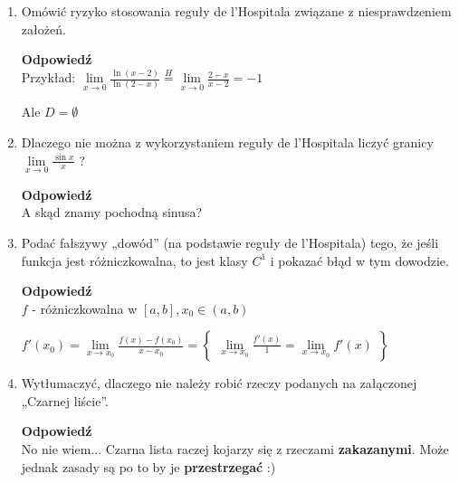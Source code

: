 \documentclass[12pt,a4paper]{article}
\theoremstyle{break}
\newcommand{\Odp}[1]{
		\begin{mdframed}[style=zadanie]
			\textbf{Odpowiedź}\\
			#1
		\end{mdframed}
	}
\begin{document}
\begin{enumerate}[1.]
	\item Omówić ryzyko stosowania reguły de l’Hospitala związane z niesprawdzeniem założeń.
	\Odp{
		Przykład: $\lim\limits_{x\rightarrow 0} \frac{\ln (x-2)}{\ln (2-x)}\overset{H}{=}\lim\limits_{x\rightarrow 0}\frac{2-x}{x-2}=-1$
		
		Ale $D=\emptyset$
	}
	
	\item Dlaczego nie można z wykorzystaniem reguły de l’Hospitala liczyć granicy $\lim\limits_{x\rightarrow0}\frac{\sin x}{x}$ ?
	\Odp{
		A skąd znamy pochodną sinusa?
	}
	
	\item Podać fałszywy „dowód” (na podstawie reguły de l’Hospitala) tego, że jeśli funkcja jest różniczkowalna, to jest klasy $C^1$ i pokazać błąd w tym dowodzie.
	\Odp{
		$f$ - różniczkowalna w $[a,b], x_0\in(a,b)$
		
		$f'(x_0)=\lim\limits_{x\rightarrow x_0}\frac{f(x)-f(x_0)}{x-x_0}=\begin{Bmatrix}
			\lim\limits_{x\rightarrow x_0} \frac{f'(x)}{1} = \lim\limits_{x\rightarrow x_0}f'(x)
		\end{Bmatrix}$
	}
	
	\item Wytłumaczyć, dlaczego nie należy robić rzeczy podanych na załączonej „Czarnej liście”.
	\Odp{
	No nie wiem... Czarna lista raczej kojarzy się z rzeczami \textbf{zakazanymi}. Może jednak zasady są po to by je \textbf{przestrzegać} :)
	}
	
	\end{enumerate}
	
\end{document}
